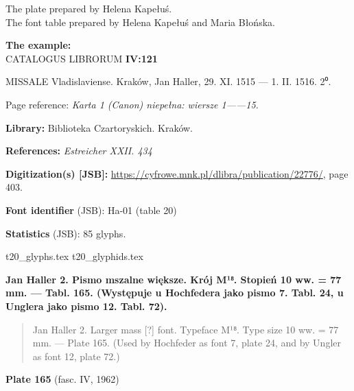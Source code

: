 \documentclass[12pt]{article}
\newcommand{\bg}{\begingl}
\newcommand{\pismoPL}[1]{{\relsize{2}\Junicode\textbf{#1}}}
\newcommand{\pismoEN}[1]{{\relsize{1}\Junicode\begin{quote}#1\end{quote}}}
\newcommand{\plate}[3]{\textbf{Plate #1} (fasc. #2, #3)}
\newcommand{\exampleBib}[1]{{\relsize{2}\Junicode\textbf{The
      example:}\\[2ex] CATALOGUS LIBRORUM \textbf{#1}}}
\newcommand{\exampleDesc}[1]{{\relsize{0}\Junicode#1}}
\newcommand{\exampleDig}[1]{{\relsize{0}\Junicode \textbf{Digitization(s) [JSB]:} #1}}
\newcommand{\exampleLib}[1]{{\relsize{0}\Junicode \textbf{Library:} #1}}
\newcommand{\examplePL}[1]{}
\newcommand{\exampleEN}[1]{}
\newcommand{\fontID}[2]{{\relsize{1}\Junicode\textbf{Font identifier} (JSB): #1 (table #2)}}
\newcommand{\fontstat}[1]{{\relsize{1}\Junicode\textbf{Statistics} (JSB): #1 glyphs.}}
\newcommand{\exampleRef}[1]{{\relsize{0}\Junicode \textbf{References:} #1}}
\newcommand{\examplePage}[1]{{Page reference: \relsize{0}\Junicode#1}}
\begin{document}
The plate prepared by Helena Kapełuś.\\
The font table prepared by Helena Kapełuś and Maria Błońska.

\bigskip

\exampleBib{IV:121}

\bigskip
\exampleDesc{MISSALE Vladislaviense. Kraków, Jan Haller, 29. XI. 1515 — 1. II. 1516. 2⁰.}

\medskip
\examplePage{\textit{Karta 1 (Canon) niepełna: wiersze 1——15.}}

  \bigskip
\exampleLib{Biblioteka Czartoryskich. Kraków.}

\bigskip
\exampleRef{\textit{Estreicher XXII. 434}}

\bigskip
\exampleDig{\url{https://cyfrowe.mnk.pl/dlibra/publication/22776/}, page 403.}






\bigskip


\fontID{Ha-01}{20}

\fontstat{85}

  {t20_glyphs.tex}
  {t20_glyphids.tex}


 
  \newpage


  

  \pismoPL{Jan Haller 2. Pismo mszalne większe. Krój M¹⁸. Stopień 10
    ww. = 77 mm. — Tabl. 165. (Występuje u Hochfedera jako pismo
    7. Tabl. 24, u Unglera jako pismo 12. Tabl. 72).}


  
\pismoEN{Jan Haller 2. Larger mass [?] font. Typeface M¹⁸. Type size 10 ww. =
    77 mm. — Plate 165. (Used by Hochfeder as font 7, plate
    24, and by Ungler as font 12, plate 72.)}

\plate{165}{IV}{1962}
\end{document}
